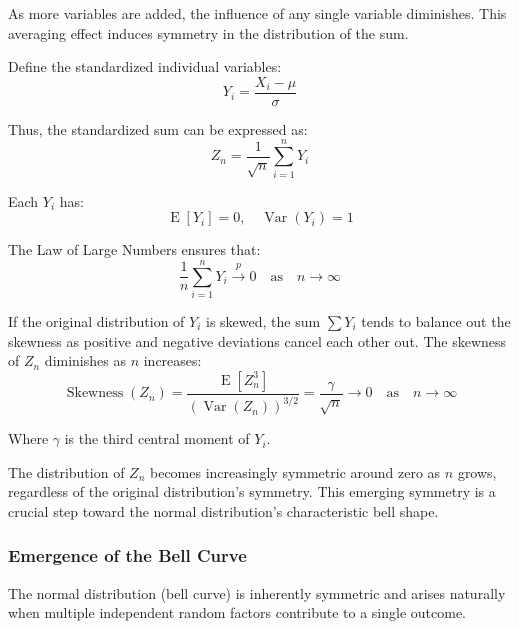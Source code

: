 \documentclass[10pt, headings=standardclasses, parskip=half, twoside]{scrartcl}
\begin{document}
As more variables are added, the influence of any single variable diminishes. This averaging effect induces symmetry in the distribution of the sum.

Define the standardized individual variables:
\[
Y_{i}=\frac{X_{i}-\mu}{\sigma}
\]

Thus, the standardized sum can be expressed as:
\[
Z_{n}=\frac{1}{\sqrt{n}} \sum_{i=1}^{n} Y_{i}
\]

Each $Y_{i}$ has:
\[
\operatorname{E}[Y_{i}]=0, \quad \operatorname{Var}(Y_{i})=1
\]

The Law of Large Numbers ensures that:
\[
\frac{1}{n} \sum_{i=1}^{n} Y_{i} \xrightarrow{p} 0 \quad \text{as} \quad n \to \infty
\]

 If the original distribution of $Y_{i}$ is skewed, the sum $\sum Y_{i}$ tends to balance out the skewness as positive and negative deviations cancel each other out. The skewness of $Z_{n}$ diminishes as $n$ increases:
\[
\operatorname{Skewness}(Z_{n})=\frac{\operatorname{E}[Z_{n}^{3}]}{(\operatorname{Var}(Z_{n}))^{3 / 2}}=\frac{\gamma}{\sqrt{n}} \to 0 \quad \text{as} \quad n \to \infty
\]

Where $\gamma$ is the third central moment of $Y_{i}$.

The distribution of $Z_{n}$ becomes increasingly symmetric around zero as $n$ grows, regardless of the original distribution's symmetry. This emerging symmetry is a crucial step toward the normal distribution's characteristic bell shape.

\subsubsection{Emergence of the Bell Curve}
The normal distribution (bell curve) is inherently symmetric and arises naturally when multiple independent random factors contribute to a single outcome.
\end{document}
